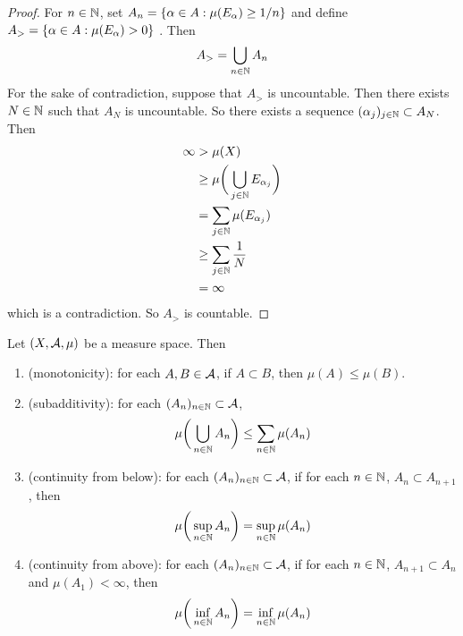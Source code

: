 \documentclass{book}
\begin{document}
	\begin{proof}
	For $n \in \mathbb{N}$, set $A_n = \{\alpha \in A: \mu(E_{\alpha}) \geq 1/n \}$ and define $ A_> = \{\alpha \in A: \mu(E_{\alpha}) >0\}$ . Then 
	$$A_> = \bigcup_{n \in \mathbb{N}}A_n$$
	For the sake of contradiction, suppose that 
	$A_>$ is uncountable. Then there exists $N \in \mathbb{N}$ such that $A_N$ is uncountable. So there exists a sequence $(\alpha_j)_{j \in \mathbb{N}} \subset A_N$. Then 
	\begin{align*}
	\infty 
	& > \mu(X) \\
	& \geq \mu \bigg( \bigcup_{j \in \mathbb{N}} E_{\alpha_{j}} \bigg) \\
	&= \sum\limits_{j \in \mathbb{N}} \mu(E_{\alpha_j}) \\
	& \geq \sum\limits_{j \in \mathbb{N}} \frac{1}{N} \\
	&= \infty
	\end{align*} 
	which is a contradiction. So $A_>$ is countable.
	\end{proof}
	
	\begin{ex} 
		Let $(X, \mathcal{A}, \mu)$ be a measure space. Then 
		\begin{enumerate}
			\item (monotonicity): for each $A,B \in \mathcal{A}$, if $A \subset B$, then $\mu(A) \leq \mu(B)$.
			\item (subadditivity): for each $(A_n)_{n \in \mathbb{N}} \subset \mathcal{A}$, $$\mu \bigg( \bigcup_{n \in \mathbb{N}} A_n \bigg) \leq \sum\limits_{n \in \mathbb{N}}\mu(A_n)$$
			\item (continuity from below): for each $(A_n)_{n \in \mathbb{N}} \subset \mathcal{A}$, if for each $n \in \mathbb{N}$, $A_n \subset A_{n+1}$, then $$\mu\bigg(\sup\limits_{n \in \mathbb{N}} A_n\bigg) = \sup\limits_{n \in \mathbb{N}}\mu(A_n)$$
			\item (continuity from above): for each $(A_n)_{n \in \mathbb{N}} \subset \mathcal{A}$, if for each $n \in \mathbb{N}$, $ A_{n+1} \subset A_n$ and $\mu(A_1) < \infty$, then $$\mu\bigg(\inf_{n \in \mathbb{N}} A_n\bigg) = \inf_{n \in \mathbb{N}}\mu(A_n)$$
		\end{enumerate}
		
	\end{ex}
	
\end{document}
